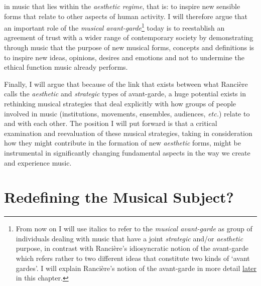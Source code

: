 in music that lies within the \emph{aesthetic regime}, that is: to inspire new sensible forms that relate to other aspects of human activity. I will therefore argue that an important role of the \emph{musical avant-garde}\footnote{From now on I will use italics to refer to the \emph{musical avant-garde} as group of individuals dealing with music that have a joint \emph{strategic} and/or \emph{aesthetic} purpose, in contrast with Ranci\`{e}re's idiosyncratic notion of the avant-garde which refers rather to two different ideas that constitute two kinds of `avant gardes'. I will explain Ranci\`{e}re's notion of the avant-garde in more detail \hyperlink{rethinkavant}{later} in this chapter.} today is to reestablish an agreement of trust with a wider range of contemporary society by demonstrating through music that the purpose of new musical forms, concepts and definitions is to inspire new ideas, opinions, desires and emotions and not to undermine the ethical function music already performs. 

Finally, I will argue that because of the link that exists between what Ranci\`{e}re calls the \emph{aesthetic} and \emph{strategic} types of avant-garde, a huge potential exists in rethinking musical strategies that deal explicitly with how groups of people involved in music (institutions, movements, ensembles, audiences, \emph{etc.}) relate to and with each other.  The position I will put forward is that a critical examination and reevaluation of these musical strategies, taking in consideration how they might contribute in the formation of new \emph{aesthetic} forms, might be instrumental in significantly changing fundamental aspects in the way we create and experience music.

\section{Redefining the Musical Subject?}

